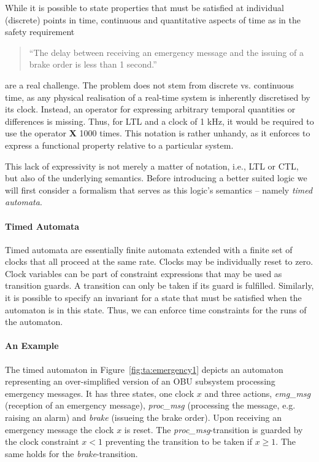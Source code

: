 \documentclass{template/openetcs_report}
\begin{document}
While it is possible to state properties that must be satisfied at individual (discrete) points in time, continuous and quantitative aspects of time as in the safety requirement
\begin{quote}
``The delay between receiving an emergency message and the issuing of a brake order is less than 1 second.''
\end{quote}
are a real challenge. The problem does not stem from discrete vs. continuous time, as any physical realisation of a real-time system is inherently discretised by its clock. Instead, an operator for expressing arbitrary temporal quantities or differences is missing. Thus, for LTL and a clock of 1 kHz, it would be required to use the operator \textbf{X} 1000 times. This notation is rather unhandy, as it enforces to express a functional property relative to a particular system.


This lack of expressivity is not merely a matter of notation, i.e., LTL or CTL, but also of the underlying semantics. Before introducing a better suited logic we will first consider a formalism that serves as this logic’s semantics -- namely \emph{timed automata}.

\paragraph{Timed Automata}

Timed automata \cite{Alur1994} are essentially finite automata extended with a finite set of clocks that all proceed at the same rate. Clocks may be individually reset to zero. Clock variables can be part of constraint expressions that may be used as transition guards. A transition can only be taken if its guard is fulfilled. Similarly, it is possible to specify an invariant for a state that must be satisfied when the automaton is in this state. Thus, we can enforce time constraints for the runs of the automaton.

\paragraph{An Example}
The timed automaton in Figure~\ref{fig:ta:emergency1} depicts an automaton representing an over-simplified version of an OBU subsystem processing emergency messages. It has three states, one clock $x$ and three actions, \textit{emg\_msg} (reception of an emergency message), \textit{proc\_msg} (processing the message, e.g. raising an alarm) and \textit{brake} (issueing the brake order). Upon receiving an emergency message the clock $x$ is reset. The \textit{proc\_msg}-transition is guarded by the clock constraint $x<1$ preventing the transition to be taken if $x\geq 1$. The same holds for the \textit{brake}-transition. 
\end{document}
